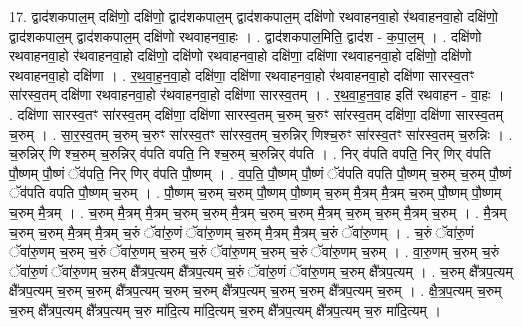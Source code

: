 \documentclass[17pt]{extarticle}
\begin{document}
17. द्वाद॑शकपाल॒म् दक्षि॑णो॒ दक्षि॑णो॒ द्वाद॑शकपाल॒म् द्वाद॑शकपाल॒म् दक्षि॑णो रथवाहनवा॒हो र॑थवाहनवा॒हो दक्षि॑णो॒ द्वाद॑शकपाल॒म् द्वाद॑शकपाल॒म् दक्षि॑णो रथवाहनवा॒हः । . द्वाद॑शकपाल॒मिति॒ द्वाद॑श - क॒पा॒ल॒म् । . दक्षि॑णो रथवाहनवा॒हो र॑थवाहनवा॒हो दक्षि॑णो॒ दक्षि॑णो रथवाहनवा॒हो दक्षि॑णा॒ दक्षि॑णा रथवाहनवा॒हो दक्षि॑णो॒ दक्षि॑णो रथवाहनवा॒हो दक्षि॑णा । . र॒थ॒वा॒ह॒न॒वा॒हो दक्षि॑णा॒ दक्षि॑णा रथवाहनवा॒हो र॑थवाहनवा॒हो दक्षि॑णा सारस्व॒तꣳ सा॑रस्व॒तम् दक्षि॑णा रथवाहनवा॒हो र॑थवाहनवा॒हो दक्षि॑णा सारस्व॒तम् । . र॒थ॒वा॒ह॒न॒वा॒ह इति॑ रथवाहन - वा॒हः । . दक्षि॑णा सारस्व॒तꣳ सा॑रस्व॒तम् दक्षि॑णा॒ दक्षि॑णा सारस्व॒तम् च॒रुम् च॒रुꣳ सा॑रस्व॒तम् दक्षि॑णा॒ दक्षि॑णा सारस्व॒तम् च॒रुम् । . सा॒र॒स्व॒तम् च॒रुम् च॒रुꣳ सा॑रस्व॒तꣳ सा॑रस्व॒तम् च॒रुन्निर् णिश्च॒रुꣳ सा॑रस्व॒तꣳ सा॑रस्व॒तम् च॒रुन्निः । . च॒रुन्निर् णि श्च॒रुम् च॒रुन्निर् व॑पति वपति॒ नि श्च॒रुम् च॒रुन्निर् व॑पति । . निर् व॑पति वपति॒ निर् णिर् व॑पति पौ॒ष्णम् पौ॒ष्णं ॅव॑पति॒ निर् णिर् व॑पति पौ॒ष्णम् । . व॒प॒ति॒ पौ॒ष्णम् पौ॒ष्णं ॅव॑पति वपति पौ॒ष्णम् च॒रुम् च॒रुम् पौ॒ष्णं ॅव॑पति वपति पौ॒ष्णम् च॒रुम् । . पौ॒ष्णम् च॒रुम् च॒रुम् पौ॒ष्णम् पौ॒ष्णम् च॒रुम् मै॒त्रम् मै॒त्रम् च॒रुम् पौ॒ष्णम् पौ॒ष्णम् च॒रुम् मै॒त्रम् । . च॒रुम् मै॒त्रम् मै॒त्रम् च॒रुम् च॒रुम् मै॒त्रम् च॒रुम् च॒रुम् मै॒त्रम् च॒रुम् च॒रुम् मै॒त्रम् च॒रुम् । . मै॒त्रम् च॒रुम् च॒रुम् मै॒त्रम् मै॒त्रम् च॒रुं ॅवा॑रु॒णं ॅवा॑रु॒णम् च॒रुम् मै॒त्रम् मै॒त्रम् च॒रुं ॅवा॑रु॒णम् । . च॒रुं ॅवा॑रु॒णं ॅवा॑रु॒णम् च॒रुम् च॒रुं ॅवा॑रु॒णम् च॒रुम् च॒रुं ॅवा॑रु॒णम् च॒रुम् च॒रुं ॅवा॑रु॒णम् च॒रुम् । . वा॒रु॒णम् च॒रुम् च॒रुं ॅवा॑रु॒णं ॅवा॑रु॒णम् च॒रुम् क्षै᳚त्रप॒त्यम् क्षै᳚त्रप॒त्यम् च॒रुं ॅवा॑रु॒णं ॅवा॑रु॒णम् च॒रुम् क्षै᳚त्रप॒त्यम् । . च॒रुम् क्षै᳚त्रप॒त्यम् क्षै᳚त्रप॒त्यम् च॒रुम् च॒रुम् क्षै᳚त्रप॒त्यम् च॒रुम् च॒रुम् क्षै᳚त्रप॒त्यम् च॒रुम् च॒रुम् क्षै᳚त्रप॒त्यम् च॒रुम् । . क्षै॒त्र॒प॒त्यम् च॒रुम् च॒रुम् क्षै᳚त्रप॒त्यम् क्षै᳚त्रप॒त्यम् च॒रु मा॑दि॒त्य मा॑दि॒त्यम् च॒रुम् क्षै᳚त्रप॒त्यम् क्षै᳚त्रप॒त्यम् च॒रु मा॑दि॒त्यम् । \newline
\end{document}
